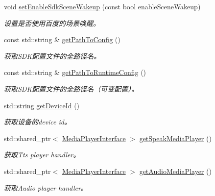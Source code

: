 \begin{DoxyCompactItemize}
void \hyperlink{structduerOSDcsSDK_1_1sdkInterfaces_1_1DcsSdkParameters_ab2820f06c3b47e1cd791e5216c1e8cff}{set\+Enable\+Sdk\+Scene\+Wakeup} (const bool enable\+Scene\+Wakeup)
\begin{DoxyCompactList}\small\item\em 设置是否使用百度的场景唤醒。 \end{DoxyCompactList}\item 
const std\+::string \& \hyperlink{structduerOSDcsSDK_1_1sdkInterfaces_1_1DcsSdkParameters_a15acf1146e64b5f08d8b0017c07eb09e}{get\+Path\+To\+Config} ()
\begin{DoxyCompactList}\small\item\em 获取\+S\+D\+K配置文件的全路径名。 \end{DoxyCompactList}\item 
const std\+::string \& \hyperlink{structduerOSDcsSDK_1_1sdkInterfaces_1_1DcsSdkParameters_a0700d03aa8a280cbd5f93ef0e40e55a5}{get\+Path\+To\+Runtime\+Config} ()
\begin{DoxyCompactList}\small\item\em 获取\+S\+D\+K配置文件的全路径名（可变配置）。 \end{DoxyCompactList}\item 
std\+::string \hyperlink{structduerOSDcsSDK_1_1sdkInterfaces_1_1DcsSdkParameters_a7d1bced577a3150094f87fd9c39792c8}{get\+Device\+Id} ()
\begin{DoxyCompactList}\small\item\em 获取设备的device id。 \end{DoxyCompactList}\item 
std\+::shared\+\_\+ptr$<$ \hyperlink{classduerOSDcsSDK_1_1sdkInterfaces_1_1MediaPlayerInterface}{Media\+Player\+Interface} $>$ \hyperlink{structduerOSDcsSDK_1_1sdkInterfaces_1_1DcsSdkParameters_a137453bcd818997f0916d48e60af3523}{get\+Speak\+Media\+Player} ()
\begin{DoxyCompactList}\small\item\em 获取\+Tts player handler。 \end{DoxyCompactList}\item 
std\+::shared\+\_\+ptr$<$ \hyperlink{classduerOSDcsSDK_1_1sdkInterfaces_1_1MediaPlayerInterface}{Media\+Player\+Interface} $>$ \hyperlink{structduerOSDcsSDK_1_1sdkInterfaces_1_1DcsSdkParameters_a778d9c0e35063af224264cb4c2d69b67}{get\+Audio\+Media\+Player} ()
\begin{DoxyCompactList}\small\item\em 获取\+Audio player handler。 \end{DoxyCompactList}\item 

\end{DoxyCompactItemize}
